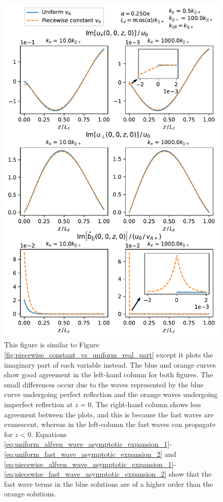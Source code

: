 \begin{figure}
    \centering
    \vspace{-20pt}
    \includegraphics[width=\textwidth,height=0.9\textheight,keepaspectratio]{figures/chapter04/piecewise_constant_vs_uniform_imag_part.pdf}
    \vspace{-10pt}
    \caption{This figure is similar to Figure \ref{fig:piecewise_constant_vs_uniform_real_part} except it plots the imaginary part of each variable instead. The blue and orange curves show good agreement in the left-hand column for both figures. The small differences occur due to the waves represented by the blue curve undergoing perfect reflection and the orange waves undergoing imperfect reflection at $z=0$. The right-hand column shows less agreement between the plots, and this is because the fast waves are evanescent, whereas in the left-column the fast waves can propagate for $z<0$. Equations  \eqref{eq:uniform_alfven_wave_asymptotic_expansion_1}-\eqref{eq:uniform_fast_wave_asymptotic_expansion_2} and \eqref{eq:piecewise_alfven_wave_asymptotic_expansion_1}-\eqref{eq:piecewise_fast_wave_asymptotic_expansion_2} show that the fast wave terms in the blue solutions are of a higher order than the orange solutions.}
    \label{fig:piecewise_constant_vs_uniform_imag_part}
    \vspace{-20pt}
\end{figure}

